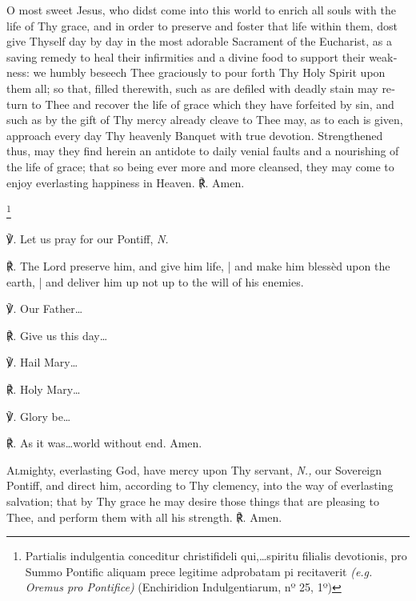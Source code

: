 \documentclass[11pt]{book}
\begin{document}

\begin{otherlanguage}{english}{\par}\end{otherlanguage}

\begin{otherlanguage}{english}

\lettrine{O}{} most sweet Jesus, who didst come into this world to enrich all souls with the life of Thy grace, and in order to preserve and foster that life within them, dost give Thyself day by day in the most adorable Sacrament of the Eucharist, as a saving remedy to heal their infirmities and a divine food to support their weakness: we humbly beseech Thee graciously to pour forth Thy Holy Spirit upon them all; so that, filled therewith, such as are defiled with deadly stain may return to Thee and recover the life of grace which they have forfeited by sin, and such as by the gift of Thy mercy already cleave to Thee may, as to each is given, approach every day Thy heavenly Banquet with true devotion. Strengthened thus, may they find herein an antidote to daily venial faults and a nourishing of the life of grace; that so being ever more and more cleansed, they may come to enjoy everlasting happiness in Heaven. ℟. Amen.

\footnote{\raggedright{Partialis indulgentia conceditur christifideli qui,…spiritu filialis devotionis, pro Summo Pontific aliquam prece legitime adprobatam pi recitaverit \textit{(e.g. Oremus pro Pontifice)} (Enchiridion Indulgentiarum, nº 25, 1º)}}

\noindent ℣. Let us pray for our Pontiff, \textit{N.}

\noindent ℟. The Lord preserve him, and give him life, | and make him blessèd upon the earth, | and deliver him up not up to the will of his enemies.

\noindent ℣. Our Father…

\noindent ℟. Give us this day…

\noindent ℣. Hail Mary…

\noindent ℟. Holy Mary…

\noindent ℣.  Glory be…

\noindent ℟. As it was…world without end. Amen.


\lettrine{A}{l}mighty, everlasting God, have mercy upon Thy servant, \textit{N.,} our Sovereign Pontiff, and direct him, according to Thy clemency, into the way of everlasting salvation; that by Thy grace he may desire those things that are pleasing to Thee, and perform them with all his strength. ℟. Amen.


\end{otherlanguage}
\end{document}
